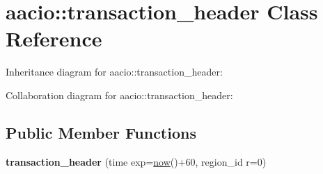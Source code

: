 \hypertarget{classaacio_1_1transaction__header}{}\section{aacio\+:\+:transaction\+\_\+header Class Reference}
\label{classaacio_1_1transaction__header}


Inheritance diagram for aacio\+:\+:transaction\+\_\+header\+:


Collaboration diagram for aacio\+:\+:transaction\+\_\+header\+:
\subsection*{Public Member Functions}
\begin{DoxyCompactItemize}
\item 
\mbox{\label{classaacio_1_1transaction__header_ac908448b007a154ea8002642e1755678}} 
{\bfseries transaction\+\_\+header} (time exp=\mbox{\hyperlink{group__systemcapi_ga5eef43c9589d6ef54a0ece1dda5e0ffe}{now}}()+60, region\+\_\+id r=0)
\end{DoxyCompactItemize}
